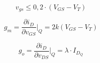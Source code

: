 \begin{equation}
    v_{gs} \leq 0,2\cdot(V_{GS} - V_T)
\end{equation}

\begin{equation}
    g_m = \frac{\partial i_D}{\partial v_{GS}} \Bigg|_Q = 2k(V_{GS} - V_T)
\end{equation}


\begin{equation}
    g_o = \frac{\partial i_D}{\partial v_{DS}} \Bigg|_Q = \lambda \cdot I_{D_Q}
\end{equation}
